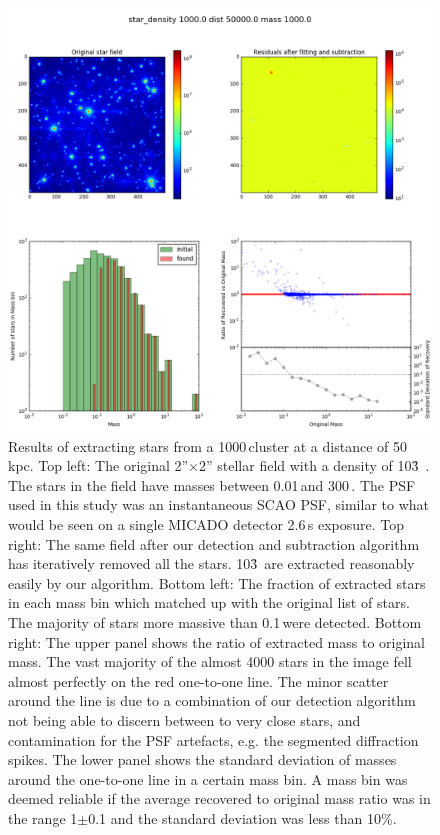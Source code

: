 \begin{figure}

    \centering
    \includegraphics[width=\textwidth]{images/results6_dist=50000_rho=1000}

    \caption{Results of extracting stars from a 1000\,\spa cluster at a distance of 50\,kpc. Top left: The original 2''$\times$2'' stellar field with a density of 10\h3~\spa. The stars in the field have masses between 0.01\,\msun and 300\,\msune. The PSF used in this study was an instantaneous SCAO PSF, similar to what would be seen on a single MICADO detector 2.6\,s exposure. Top right: The same field after our detection and subtraction algorithm has iteratively removed all the stars. 10\h3~\spa are extracted reasonably easily by our algorithm. Bottom left: The fraction of extracted stars in each mass bin which matched up with the original list of stars. The majority of stars more massive than 0.1\,\msun were detected. Bottom right: The upper panel shows the ratio of extracted mass to original mass. The vast majority of the almost 4000 stars in the image fell almost perfectly on the red one-to-one line. The minor scatter around the line is due to a combination of our detection algorithm not being able to discern between to very close stars, and contamination for the PSF artefacts, e.g. the segmented diffraction spikes. The lower panel shows the standard deviation of masses around the one-to-one line in a certain mass bin. A mass bin was deemed reliable if the average recovered to original mass ratio was in the range 1$\pm$0.1 and the standard deviation was less than 10\%.}
    
    \label{fig:results_lmc_1E3}
    
\end{figure}


